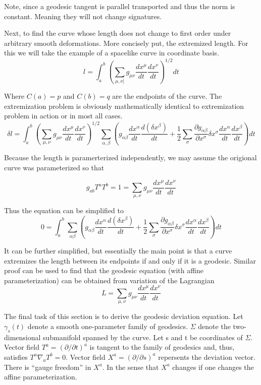 Note, since a geodesic tangent is parallel transported and thus the norm is constant. Meaning they will not change signatures.

Next, to find the curve whose length does not change to first order under arbitrary smooth deformations. More concisely put, the extremized length. For this we will take the example of a spacelike curve in coordinate basis.
\[
l=\int_a^b \left(\sum_{\mu, \nu]}g_{\mu \nu}\frac{dx^\mu}{dt}\frac{dx^\nu}{dt}  \right)^{1/2} dt
\]

Where $C(a)=p$ and $C(b)=q$ are the endpoints of the curve. The extremization problem is obviously mathematically identical to extremization problem in action or in most all cases.
\[
\delta l=\int_a^b \left(\sum_{\mu, \nu}g_{\mu \nu}\frac{dx^\mu}{dt}\frac{dx^\nu}{dt}  \right)^{1/2} \sum_{\alpha, \beta} \left( g_{\alpha \beta}\frac{dx^\alpha}{dt}\frac{d(\delta x^\beta)}{dt} + \frac{1}{2} \sum_\sigma \frac{\partial g_{\alpha \beta}}{\partial x^\sigma} \delta x^\sigma \frac{dx^\alpha}{dt}\frac{dx^\beta}{dt} \right) dt
\]

Because the length is paramerterized independently, we may assume the origional curve was parameterized so that

\[
g_{ab}T^aT^b = 1 = \sum_{\mu, \nu} g_{\mu \nu} \frac{dx^\mu}{dt}\frac{dx^\nu}{dt}
\]

Thus the equation can be simplified to
\[
0 = \int_a^b \sum_{\alpha \beta} \left( g_{\alpha \beta}\frac{dx^\alpha}{dt}\frac{d(\delta x^\beta)}{dt} + \frac{1}{2} \sum_\sigma \frac{\partial g_{\alpha \beta}}{\partial x^\sigma} \delta x^\sigma \frac{dx^\alpha}{dt}\frac{dx^\beta}{dt} \right) dt
\]

It can be further simplified, but essentially the main point is that a curve extremizes the length between its endpoints if and only if it is a geodesic. Similar proof can be used to find that the geodesic equation (with affine parameterization) can be obtained from variation of the Lagrangian
\[
L= \sum_{\mu, \nu} g_{\mu \nu} \frac{dx^\mu}{dt}\frac{dx^\nu}{dt}
\]

The final task of this section is to derive the geodesic deviation equation. Let $\gamma_s(t)$ denote a smooth one-parameter family of geodesics. $\Sigma$ denote the two-dimensional submanifold spanned by the curve. Let s and t be coordinates of $\Sigma$. Vector field $T^a = (\partial / \partial t)^a$ is tangent to the family of geodesics and, thus, satisfies $T^a \nabla_a T^b = 0 $. Vector field $X^a=(\partial / \partial s)^a$ repersents the deviation vector. There is ``gauge freedom'' in $X^a$. In the sense that $X^a$ changes if one changes the affine parameterization.

